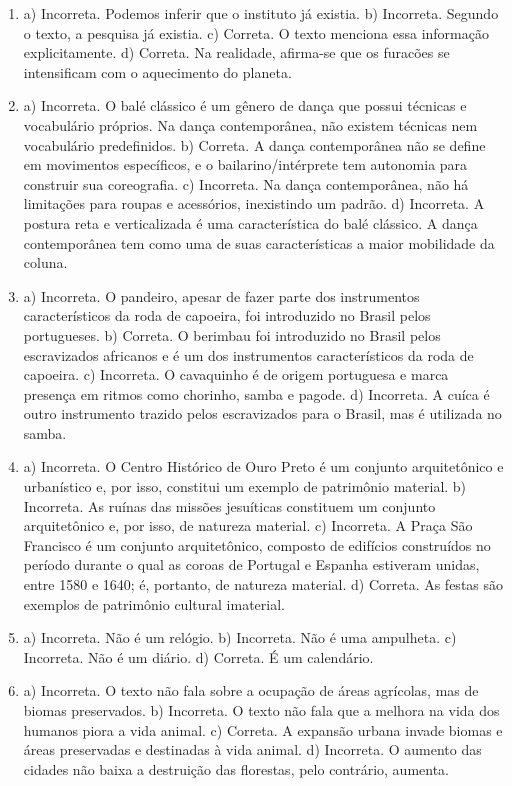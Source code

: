 \begin{enumerate}
\item
a) Incorreta. Podemos inferir que o instituto já existia.
b) Incorreta. Segundo o texto, a pesquisa já existia.
c) Correta. O texto menciona essa informação explicitamente.
d) Correta. Na realidade, afirma-se que os furacões se intensificam com o aquecimento do planeta.

\item
a) Incorreta. O balé clássico é um gênero de dança que possui técnicas e
  vocabulário próprios. Na dança contemporânea, não existem técnicas nem
  vocabulário predefinidos.
b) Correta. A dança contemporânea não se define em movimentos específicos,
  e o bailarino/intérprete tem autonomia para construir sua coreografia.
c) Incorreta. Na dança contemporânea, não há limitações para roupas e
  acessórios, inexistindo um padrão.
d) Incorreta. A postura reta e verticalizada é uma característica do balé
  clássico. A dança contemporânea tem como uma de suas características a
  maior mobilidade da coluna.

\item
a) Incorreta. O pandeiro, apesar de fazer parte dos instrumentos
característicos da roda de capoeira, foi introduzido no Brasil pelos
portugueses.
b) Correta. O berimbau foi introduzido no Brasil pelos escravizados
africanos e é um dos instrumentos característicos da roda de capoeira.
c) Incorreta. O cavaquinho é de origem portuguesa e marca presença em
ritmos como chorinho, samba e pagode.
d) Incorreta. A cuíca é outro instrumento trazido pelos escravizados para o
Brasil, mas é utilizada no samba.

\item
a) Incorreta. O Centro Histórico de Ouro Preto é um conjunto arquitetônico e
urbanístico e, por isso, constitui um exemplo de patrimônio material.
b) Incorreta. As ruínas das missões jesuíticas constituem um
conjunto arquitetônico e, por isso, de natureza material.
c) Incorreta. A Praça São Francisco é um conjunto arquitetônico,
composto de edifícios construídos no período durante o qual as coroas de
Portugal e Espanha estiveram unidas, entre 1580 e 1640; é, portanto, de
natureza material.
d) Correta. As festas são exemplos de patrimônio cultural imaterial.

\item
a) Incorreta. Não é um relógio.
b) Incorreta. Não é uma ampulheta.
c) Incorreta. Não é um diário.
d) Correta. É um calendário.

\item
a) Incorreta. O texto não fala sobre a ocupação de áreas agrícolas, mas
de biomas preservados.
b) Incorreta. O texto não fala que a melhora na vida dos humanos piora a
vida animal.
c) Correta. A expansão urbana invade biomas e áreas preservadas e
destinadas à vida animal.
d) Incorreta. O aumento das cidades não baixa a destruição das
florestas, pelo contrário, aumenta.


\end{enumerate}
